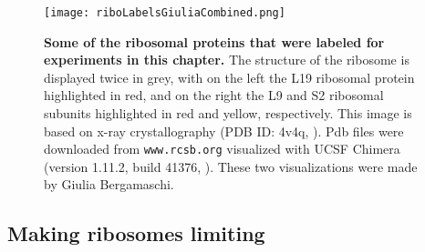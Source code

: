 \begin{figure}
    \centering
    \texttt{[image: riboLabelsGiuliaCombined.png]}
    \caption{ 
        \textbf{Some of the ribosomal proteins that were labeled for experiments in this chapter.}
        The structure of the ribosome is displayed twice in grey, with on the left the L19 ribosomal protein highlighted in red, and on the right the L9 and S2 ribosomal subunits highlighted in red and yellow, respectively.
        This image is based on x-ray crystallography (PDB ID: 4v4q, \cite{Schuwirth2005}). Pdb files were downloaded from \texttt{www.rcsb.org} \cite{Berman2000} 
        visualized with UCSF Chimera (version 1.11.2, build 41376, \cite{pettersen2004}). These two visualizations were made by Giulia Bergamaschi.
    }
    \label{fig:ribo:labelsPicGiulia}
\end{figure}


\subsection{Making ribosomes limiting}



